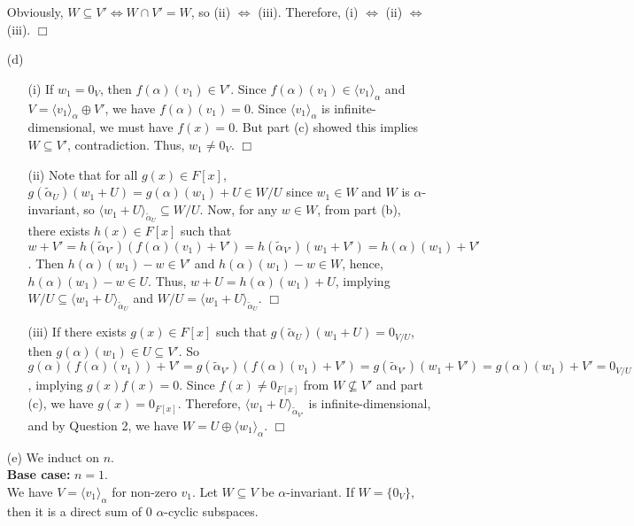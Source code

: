 \documentclass[12pt]{article}
\begin{document}
\begin{enumerate}
        Obviously, $W \subseteq V' \Leftrightarrow W \cap V' = W$, so (ii) $\Leftrightarrow$ (iii). Therefore, (i) $\Leftrightarrow$ (ii) $\Leftrightarrow$ (iii). \hfill $\Box$
        \item[(d)] \begin{enumerate}
            \item[(i)] If $w_1 = 0_V$, then $f(\alpha)(v_1) \in V'$. Since $f(\alpha)(v_1) \in \langle v_1 \rangle_\alpha$ and $V = \langle v_1 \rangle_\alpha \oplus V'$, we have $f(\alpha)(v_1) = 0$. Since $\langle v_1 \rangle_\alpha$ is infinite-dimensional, we must have $f(x) = 0$. But part (c) showed this implies $W \subseteq V'$, contradiction. Thus, $w_1 \ne 0_V$. \hfill $\Box$
            \item[(ii)] Note that for all $g(x) \in F[x]$, $g(\widetilde{\alpha}_U)(w_1 + U) = g(\alpha)(w_1) + U \in W/U$ since $w_1 \in W$ and $W$ is $\alpha$-invariant, so $\langle w_1 + U \rangle_{\widetilde{\alpha}_U} \subseteq W/U$. Now, for any $w \in W$, from part (b), there exists $h(x) \in F[x]$ such that $w + V' = h(\widetilde{\alpha}_{V'})(f(\alpha)(v_1) + V') = h(\widetilde{\alpha}_{V'})(w_1 + V') = h(\alpha)(w_1) + V'$. Then $h(\alpha)(w_1) - w \in V'$ and $h(\alpha)(w_1) - w \in W$, hence, $h(\alpha)(w_1) - w \in U$. Thus, $w + U = h(\alpha)(w_1) + U$, implying $W/U \subseteq \langle w_1 + U \rangle_{\widetilde{\alpha}_U}$ and $W/U = \langle w_1 + U \rangle_{\widetilde{\alpha}_U}$. \hfill $\Box$
            \item[(iii)] If there exists $g(x) \in F[x]$ such that $g(\widetilde{\alpha}_U)(w_1 + U) = 0_{V/U}$, then $g(\alpha)(w_1) \in U \subseteq V'$. So $g(\alpha)(f(\alpha)(v_1)) + V' = g(\widetilde{\alpha}_{V'})(f(\alpha)(v_1) + V') = g(\widetilde{\alpha}_{V'})(w_1 + V') = g(\alpha)(w_1) + V' = 0_{V/U}$, implying $g(x)f(x) = 0$. Since $f(x) \ne 0_{F[x]}$ from $W \nsubseteq V'$ and part (c), we have $g(x) = 0_{F[x]}$. Therefore, $\langle w_1 + U\rangle_{\widetilde{\alpha}_{V'}}$ is infinite-dimensional, and by Question 2, we have $W = U \oplus \langle w_1 \rangle_\alpha$. \hfill $\Box$
        \end{enumerate}
        \item[(e)] We induct on $n$. \\
        \textbf{Base case:} $n = 1$. \\
        We have $V = \langle v_1 \rangle_\alpha$ for non-zero $v_1$. Let $W \subseteq V$ be $\alpha$-invariant. If $W = \{0_V\}$, then it is a direct sum of $0$ $\alpha$-cyclic subspaces. \\

\end{enumerate}
\end{document}
